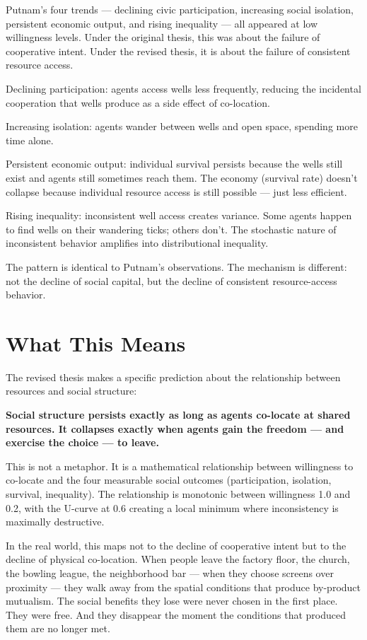Putnam's four trends --- declining civic participation, increasing social isolation, persistent economic output, and rising inequality --- all appeared at low willingness levels. Under the original thesis, this was about the failure of cooperative intent. Under the revised thesis, it is about the failure of consistent resource access.

Declining participation: agents access wells less frequently, reducing the incidental cooperation that wells produce as a side effect of co-location.

Increasing isolation: agents wander between wells and open space, spending more time alone.

Persistent economic output: individual survival persists because the wells still exist and agents still sometimes reach them. The economy (survival rate) doesn't collapse because individual resource access is still possible --- just less efficient.

Rising inequality: inconsistent well access creates variance. Some agents happen to find wells on their wandering ticks; others don't. The stochastic nature of inconsistent behavior amplifies into distributional inequality.

The pattern is identical to Putnam's observations. The mechanism is different: not the decline of social capital, but the decline of consistent resource-access behavior.

\section{What This Means}\label{what-this-means}

The revised thesis makes a specific prediction about the relationship between resources and social structure:

\textbf{Social structure persists exactly as long as agents co-locate at shared resources. It collapses exactly when agents gain the freedom --- and exercise the choice --- to leave.}

This is not a metaphor. It is a mathematical relationship between willingness to co-locate and the four measurable social outcomes (participation, isolation, survival, inequality). The relationship is monotonic between willingness 1.0 and 0.2, with the U-curve at 0.6 creating a local minimum where inconsistency is maximally destructive.

In the real world, this maps not to the decline of cooperative intent but to the decline of physical co-location. When people leave the factory floor, the church, the bowling league, the neighborhood bar --- when they choose screens over proximity --- they walk away from the spatial conditions that produce by-product mutualism. The social benefits they lose were never chosen in the first place. They were free. And they disappear the moment the conditions that produced them are no longer met.


